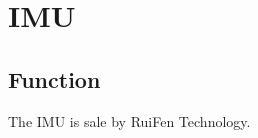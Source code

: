\setchapterpreamble[u]{\margintoc}
\chapter{IMU}

\section{Function}
The IMU is sale by RuiFen Technology.

